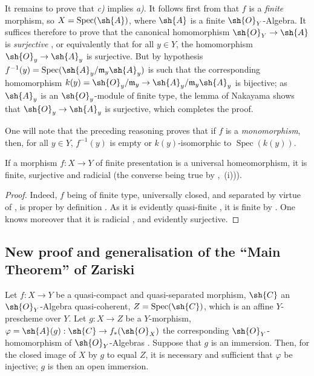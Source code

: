It remains to prove that \emph{c)} implies \emph{a)}.
It follows first from  that $f$ is a \emph{finite} morphism, so $X=\operatorname{Spec}(\sh{A})$, where $\sh{A}$ is a finite $\sh{O}_Y$-Algebra.
It suffices therefore to prove that the canonical homomorphism $\sh{O}_Y\to\sh{A}$ is \emph{surjective} , or equivalently that for all $y\in Y$, the homomorphism $\sh{O}_y\to\sh{A}_y$ is surjective.
But by hypothesis
$f^{-1}(y)=\operatorname{Spec}(\sh{A}_y/\mathfrak{m}_y\sh{A}_y)$  is such that the corresponding homomorphism $k(y)=\sh{O}_y/\mathfrak{m}_y\to\sh{A}_y/\mathfrak{m}_y\sh{A}_y$ is bijective; as $\sh{A}_y$ is an $\sh{O}_y$-module of finite type, the lemma of Nakayama shows that $\sh{O}_y\to\sh{A}_y$ is surjective, which completes the proof.

\begin{remark}[8.11.5.1]
\label{IV.8.11.5.1}
One will note that the preceding reasoning proves that if $f$ is a \emph{monomorphism}, then, for all $y\in Y$, $f^{-1}(y)$ is empty or $k(y)$-isomorphic to $\operatorname{Spec}(k(y))$.
\end{remark}

\begin{proposition}[8.11.6]
\label{IV.8.11.6}
If a morphism $f:X\to Y$ of finite presentation is a universal homeomorphism, it is finite, surjective and radicial (the converse being true by ,~(i))).
\end{proposition}

\begin{proof}
Indeed, $f$ being of finite type, universally closed, and separated by virtue of , is proper by definition .
As it is evidently quasi-finite , it is finite by .
One knows moreover that it is radicial , and evidently surjective.
\end{proof}

\subsection{New proof and generalisation of the ``Main Theorem'' of Zariski}
\label{subsection:IV.8.12}
\label{IV.8.12}

\begin{lemma}[8.12.1]
\label{IV.8.12.1}
Let $f:X\to Y$ be a quasi-compact and quasi-separated morphism, $\sh{C}$ an $\sh{O}_Y$-Algebra quasi-coherent, $Z=\operatorname{Spec}(\sh{C})$, which is an affine $Y$-prescheme over $Y$.
Let $g:X\to Z$ be a $Y$-morphism, $\varphi=\sh{A}(g):\sh{C}\to f_*(\sh{O}_X)$ the corresponding $\sh{O}_Y$-homomorphism of $\sh{O}_Y$-Algebras .
Suppose that $g$ is an immersion.
Then, for the closed image of $X$ by $g$  to equal $Z$, it is necessary and sufficient that $\varphi$ be injective; $g$ is then an open immersion.
\end{lemma}

